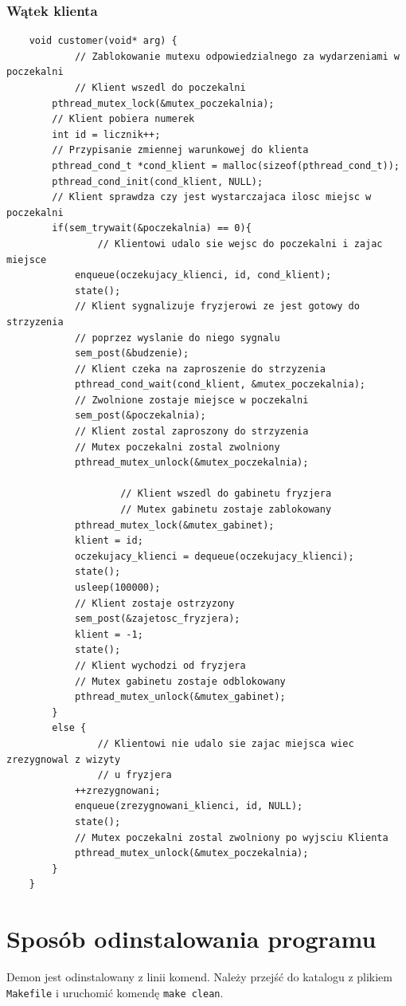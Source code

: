 \documentclass[12pt,a4paper]{article}
\begin{document}
 	\subsubsection{Wątek klienta}
 	\begin{lstlisting}
	void customer(void* arg) {
			// Zablokowanie mutexu odpowiedzialnego za wydarzeniami w poczekalni
			// Klient wszedl do poczekalni
    	pthread_mutex_lock(&mutex_poczekalnia);
    	// Klient pobiera numerek
    	int id = licznik++;
    	// Przypisanie zmiennej warunkowej do klienta
    	pthread_cond_t *cond_klient = malloc(sizeof(pthread_cond_t));
    	pthread_cond_init(cond_klient, NULL);
    	// Klient sprawdza czy jest wystarczajaca ilosc miejsc w poczekalni
    	if(sem_trywait(&poczekalnia) == 0){
    			// Klientowi udalo sie wejsc do poczekalni i zajac miejsce
        	enqueue(oczekujacy_klienci, id, cond_klient);
        	state();
        	// Klient sygnalizuje fryzjerowi ze jest gotowy do strzyzenia
        	// poprzez wyslanie do niego sygnalu
        	sem_post(&budzenie);
        	// Klient czeka na zaproszenie do strzyzenia
        	pthread_cond_wait(cond_klient, &mutex_poczekalnia);
        	// Zwolnione zostaje miejsce w poczekalni
        	sem_post(&poczekalnia);
        	// Klient zostal zaproszony do strzyzenia
        	// Mutex poczekalni zostal zwolniony
        	pthread_mutex_unlock(&mutex_poczekalnia);
			
					// Klient wszedl do gabinetu fryzjera
					// Mutex gabinetu zostaje zablokowany
    	    pthread_mutex_lock(&mutex_gabinet);
	        klient = id;
        	oczekujacy_klienci = dequeue(oczekujacy_klienci);
	        state();
        	usleep(100000);
        	// Klient zostaje ostrzyzony
    	    sem_post(&zajetosc_fryzjera);
	        klient = -1;
        	state();
        	// Klient wychodzi od fryzjera
        	// Mutex gabinetu zostaje odblokowany
        	pthread_mutex_unlock(&mutex_gabinet);
    	}
    	else {
    			// Klientowi nie udalo sie zajac miejsca wiec zrezygnowal z wizyty 
    			// u fryzjera
        	++zrezygnowani;
	        enqueue(zrezygnowani_klienci, id, NULL);
    	    state();
    	    // Mutex poczekalni zostal zwolniony po wyjsciu Klienta
   		    pthread_mutex_unlock(&mutex_poczekalnia);
	    }
	}
	\end{lstlisting}

 	\section{Sposób odinstalowania programu}
 	Demon jest odinstalowany z linii komend. Należy przejść do katalogu z plikiem 
 	\texttt{Makefile} i uruchomić komendę \texttt{make clean}.
\end{document}
